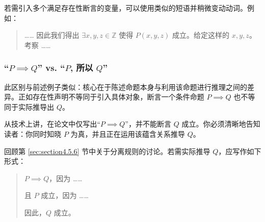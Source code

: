 若需引入多个满足存在性断言的变量，可以使用类似的短语并稍微变动动词。例如：
\begin{quote}
    …… 因此我们得出 $\exists x, y, z \in \mathbb{Z}$ 使得 $P(x, y, z)$ 成立。给定这样的 $x, y, z$。考察 ……
\end{quote}

\subsubsection*{``$P \implies Q$'' vs. ``$P$, 所以 $Q$''}

此区别与前述例子类似：核心在于陈述命题本身与利用该命题进行推理之间的差异。正如存在性声明不等同于引入具体对象，断言一个条件命题 $P \implies Q$ 也不等同于实际推导出 $Q$。

从技术上讲，在论文中仅写出``$P \implies Q$''，并不能断言 $Q$ 成立。你必须清晰地告知读者：你同时知晓 $P$ 为真，并且正在运用该蕴含关系推导 $Q$。

回顾第 \ref{sec:section4.5.6} 节中关于分离规则的讨论。若需实际推导 $Q$，应写作如下形式：
\begin{quote}
    $P \implies Q$，因为 ……

    且 $P$ 成立，因为 ……

    因此，$Q$ 成立。
\end{quote}